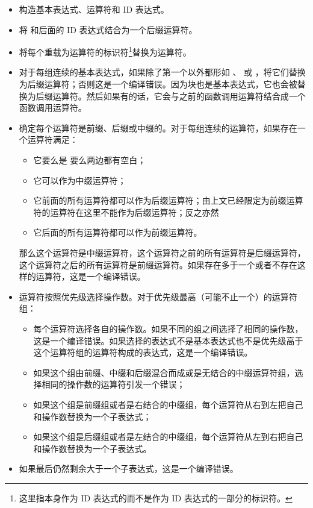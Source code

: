 \begin{itemize}
\item 构造基本表达式、运算符和 ID 表达式。
\item 将  和后面的 ID 表达式结合为一个后缀运算符。
\item 将每个重载为运算符的标识符\footnote{这里指本身作为 ID 表达式的而不是作为 ID 表达式的一部分的标识符。}替换为运算符。
\item 对于每组连续的基本表达式，如果除了第一个以外都形如 、\tcode{[...]} 或 ，将它们替换为后缀运算符；否则这是一个编译错误。\enternote 因为块也是基本表达式，它也会被替换为后缀运算符。然后如果有的话，它会与之前的函数调用运算符结合成一个函数调用运算符。\exitnote
\item 确定每个运算符是前缀、后缀或中缀的。对于每组连续的运算符，如果存在一个运算符满足：
\begin{itemize}
    \item 它要么是 \tcode{;} 要么两边都有空白；
    \item 它可以作为中缀运算符；
    \item 它前面的所有运算符都可以作为后缀运算符；\enternote 由上文已经限定为前缀运算符的运算符在这里不能作为后缀运算符；反之亦然 \exitnote
    \item 它后面的所有运算符都可以作为前缀运算符。
\end{itemize}
那么这个运算符是中缀运算符，这个运算符之前的所有运算符是后缀运算符，这个运算符之后的所有运算符是前缀运算符。如果存在多于一个或者不存在这样的运算符，这是一个编译错误。
\item 运算符按照优先级选择操作数。对于优先级最高（可能不止一个）的运算符组：
\begin{itemize}
    \item 每个运算符选择各自的操作数。如果不同的组之间选择了相同的操作数，这是一个编译错误。如果选择的表达式不是基本表达式也不是优先级高于这个运算符组的运算符构成的表达式，这是一个编译错误。
    \item 如果这个组由前缀、中缀和后缀混合而成或是无结合的中缀运算符组，选择相同的操作数的运算符引发一个错误；
    \item 如果这个组是前缀组或者是右结合的中缀组，每个运算符从右到左把自己和操作数替换为一个子表达式；
    \item 如果这个组是后缀组或者是左结合的中缀组，每个运算符从左到右把自己和操作数替换为一个子表达式。
\end{itemize}
\item 如果最后仍然剩余大于一个子表达式，这是一个编译错误。
\end{itemize}

